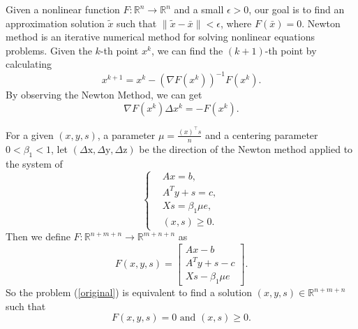 Given a nonlinear function $F:\mathbb{R}^n \rightarrow \mathbb{R}^n$ and a small $\epsilon>0$, our goal is to find an approximation solution $\tilde{x}$ such that $\lVert \tilde{x}-\bar{x} \rVert<\epsilon$, where $F(\bar{x})=0$.  Newton method is an iterative numerical method for solving nonlinear equations problems. Given the $k$-th point $x^k$, we can find the $(k+1)$-th point by calculating
\begin{equation}
    x^{k+1} = x^k-(\nabla F(x^k))^{-1}F(x^k).
\end{equation}
By observing the Newton Method, we can get
\begin{equation}
    \nabla F(x^k) \Delta x^k= -F(x^k).
\end{equation}

For a given $\left(x, y, s\right)$, a parameter $\mu=\frac{\left(x\right)^{\top} s}{n}$ and a centering parameter $0<\beta_1<1$, let $(\Delta \mathrm{x}, \Delta \mathrm{y}, \Delta \mathrm{z})$ be the direction of the Newton method applied to the system of
\begin{equation}\label{original}
\left\{
\begin{aligned}
& A x = b, \\
& A^T y + s = c, \\
& X s = \beta_1\mu e, \\
& (x, s) \geq 0.
\end{aligned}
\right.
\end{equation}
Then we define $F:\mathbb{R}^{n+m+n} \rightarrow \mathbb{R}^{m+n+n}$ as
\begin{equation}
    F(x, y, s)=\left[\begin{array}{l}
A x-b \\
A^T y+s-c \\
X s-\beta_1\mu e
\end{array}\right].
\end{equation}
So the problem (\ref{original}) is equivalent to find a solution $(x, y, s) \in \mathbb{R}^{n+m+n}$ such that
\begin{equation}
    F(x, y, s)=0 \text { and } (x, s) \geq 0.
\end{equation}

